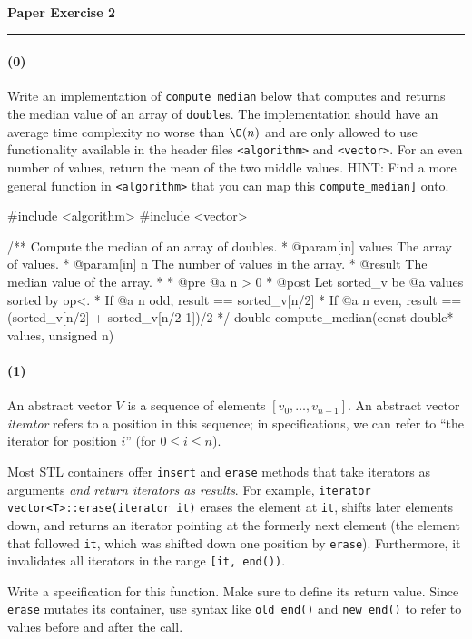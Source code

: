 \documentclass[12pt,letterpaper,twoside]{article}
\begin{document}
{\centering \textbf{Paper Exercise 2}}
\vspace*{-8pt}\noindent\rule{\linewidth}{1pt}

\paragraph{(0)} Write an implementation of {\tt compute\_median} below that computes and returns the median value of an array of {\tt double}s. The implementation should have an average time complexity no worse than $\O(n)$ and are only allowed to use functionality available in the header files {\tt <algorithm>} and {\tt <vector>}. For an even number of values, return the mean of the two middle values. HINT: Find a more general function in {\tt <algorithm>} that you can map this {\tt compute\_median]} onto.
\begin{cpp}
#include <algorithm>
#include <vector>

/** Compute the median of an array of doubles.
 * @param[in] values  The array of values.
 * @param[in]      n  The number of values in the array.
 * @result The median value of the array.
 *
 * @pre @a n > 0
 * @post Let sorted_v be @a values sorted by op<.
 *         If @a n odd,  result ==  sorted_v[n/2]
 *         If @a n even, result == (sorted_v[n/2] + sorted_v[n/2-1])/2
 */
double compute_median(const double* values, unsigned n)
\end{cpp}

\paragraph{(1)} An abstract vector $V$ is a sequence of elements $[v_0,
\dots, v_{n-1}]$. An abstract vector \emph{iterator} refers to a position
in this sequence; in specifications, we can refer to ``the iterator for position
$i$'' (for $0\leq i\leq n$).

Most STL containers offer \texttt{insert} and \texttt{erase} methods that take iterators as arguments \emph{and return iterators as results}. For example, \texttt{iterator vector<T>::erase(iterator it)} erases the element at \texttt{it}, shifts later elements down, and returns an iterator pointing at the formerly next element (the element that followed \texttt{it}, which was shifted down one position by \texttt{erase}). Furthermore, it invalidates all iterators in the range \texttt{[it, end())}.

Write a specification for this function. Make sure to define its return value. Since {\tt erase} mutates its container, use syntax like {\tt old end()} and {\tt new end()} to refer to values before and after the call.
\end{document}
